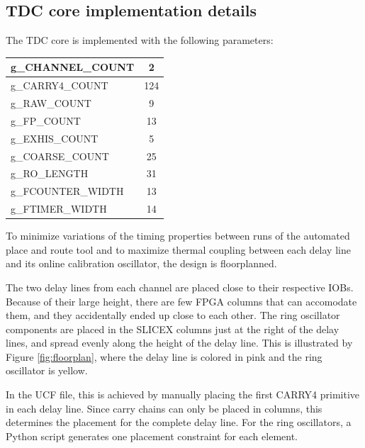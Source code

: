 \documentclass[a4paper,11pt]{article}
\begin{document}
\subsection{TDC core implementation details}
The TDC core is implemented with the following parameters:

\begin{center}
\begin{tabular}{|l|c|}
\hline
g\_CHANNEL\_COUNT & 2 \\
\hline
g\_CARRY4\_COUNT & 124 \\
\hline
g\_RAW\_COUNT & 9 \\
\hline
g\_FP\_COUNT & 13 \\
\hline
g\_EXHIS\_COUNT & 5 \\
\hline
g\_COARSE\_COUNT & 25 \\
\hline
g\_RO\_LENGTH & 31 \\
\hline
g\_FCOUNTER\_WIDTH & 13 \\
\hline
g\_FTIMER\_WIDTH & 14 \\
\hline
\end{tabular}
\end{center}

To minimize variations of the timing properties between runs of the automated place and route tool and to maximize thermal coupling between each delay line and its online calibration oscillator, the design is floorplanned.

The two delay lines from each channel are placed close to their respective IOBs. Because of their large height, there are few FPGA columns that can accomodate them, and they accidentally ended up close to each other. The ring oscillator components are placed in the SLICEX columns just at the right of the delay lines, and spread evenly along the height of the delay line. This is illustrated by Figure \ref{fig:floorplan}, where the delay line is colored in pink and the ring oscillator is yellow.

In the UCF file, this is achieved by manually placing the first CARRY4 primitive in each delay line. Since carry chains can only be placed in columns, this determines the placement for the complete delay line. For the ring oscillators, a Python script generates one placement constraint for each element.
\end{document}
